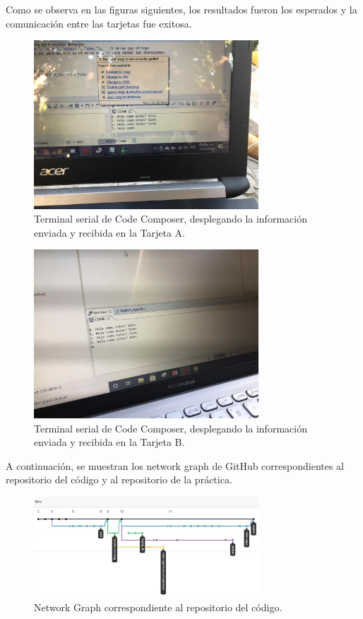 \documentclass[12pt, letterpaper]{article}
\begin{document}
Como se observa en las figuras siguientes, los resultados fueron los esperados y la comunicación entre las tarjetas fue exitosa.

\begin{figure}[H]
    \centering
    \includegraphics[width=0.75\textwidth]{img/desarrollo/RES_2.jpg}
    \caption{Terminal serial de Code Composer, desplegando la información enviada y recibida en la Tarjeta A.}
\end{figure}

\begin{figure}[H]
    \centering
    \includegraphics[width=0.75\textwidth]{img/desarrollo/RES_3.jpg}
    \caption{Terminal serial de Code Composer, desplegando la información enviada y recibida en la Tarjeta B.}
\end{figure}

A continuación, se muestran los network graph de GitHub correspondientes al repositorio del código y al repositorio de la práctica.

\begin{figure}[H]
    \centering
    \includegraphics[width=0.75\textwidth]{img/desarrollo/CODE_NETWORK.jpg}
    \caption{Network Graph correspondiente al repositorio del código.}
\end{figure}
\end{document}
